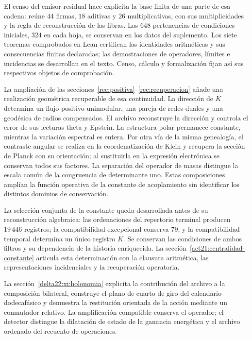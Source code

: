 El censo del emisor residual hace explícita la base finita de una parte de esa cadena: reúne \(44\) firmas, \(18\) aditivas y \(26\) multiplicativas, con sus multiplicidades y la regla de reconstrucción de las fibras. Las \(648\) pertenencias de condiciones iniciales, \(324\) en cada hoja, se conservan en los datos del suplemento. Los siete teoremas comprobados en Lean certifican las identidades aritméticas y sus consecuencias finitas declaradas; las demostraciones de operadores, límites e incidencias se desarrollan en el texto. Censo, cálculo y formalización fijan así sus respectivos objetos de comprobación.


La ampliación de las secciones~\ref{rec:positiva}--\ref{rec:recuperacion} añade una realización geométrica recuperable de esa continuidad. La dirección de \(K\) determina un flujo positivo unimodular, una pareja de redes duales y una geodésica de radios compensados. El archivo reconstruye la dirección y controla el error de sus lecturas theta y Epstein. La estructura polar permanece constante, mientras la variación espectral es entera. Por otra vía de la misma genealogía, el contraste angular se realiza en la coordenatización de Klein y recupera la sección de Planck con su orientación; al sustituirla en la expresión electrónica se conservan todos sus factores. La separación del operador de masas distingue la escala común de la congruencia de determinante uno. Estas composiciones amplían la función operativa de la constante de acoplamiento sin identificar los distintos dominios de conservación.

\newpage %
La selección conjunta de la constante queda desarrollada antes de su
reconstrucción algebraica: las ordenaciones del repertorio terminal producen
\(19\,446\) registros; la compatibilidad excepcional conserva \(79\), y la
compatibilidad temporal determina un único registro \(K\). Se conservan las
condiciones de ambos filtros y su dependencia de la historia enriquecida.
La sección~\ref{act21:centralidad-constante} articula esta determinación con
la clausura aritmética, las representaciones incidenciales y la recuperación
operatoria.

\par
La sección~\ref{delta22:xi:holonomia} explicita la contribución del archivo a la composición bilateral, construye el plano de cuarto de giro del calendario dodecafásico y demuestra la restitución orientada de la acción mediante un conmutador relativo. La amplificación compatible conserva el operador; el detector distingue la dilatación de estado de la ganancia energética y el archivo ordenado del recuento de operaciones.


